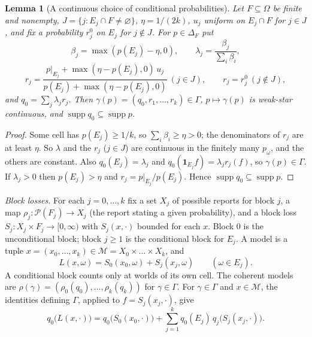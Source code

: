 \documentclass[11pt]{article}
\newtheorem{lemma}[theorem]{Lemma}
\theoremstyle{definition}
\theoremstyle{remark}
\newcommand{\M}{\mathcal M}
\newcommand{\PP}{\mathcal P}
\newcommand{\one}{\mathbf 1}
\newcommand{\supp}{\operatorname{supp}}
\begin{document}
\begin{lemma}[A continuous choice of conditional probabilities]\label{lem:section}
Let $F\subseteq\Omega$ be finite and nonempty, $J=\{j:E_j\cap F\ne\varnothing\}$, $\eta=1/(2k)$, $u_j$ uniform on $E_j\cap F$ for $j\in J$, and fix a probability $r_j^0$ on $E_j$ for $j\notin J$. For $p\in\Delta_F$ put
\[
\beta_j=\max(p(E_j)-\eta,0),\qquad \lambda_j=\frac{\beta_j}{\sum_i\beta_i},
\]
\[
r_j=\frac{p|_{E_j}+\max(\eta-p(E_j),0)\,u_j}{p(E_j)+\max(\eta-p(E_j),0)}\ (j\in J),\qquad r_j=r_j^0\ (j\notin J),
\]
and $q_0=\sum_j\lambda_jr_j$. Then $\gamma(p)=(q_0,r_1,\dots,r_k)\in\Gamma$, $p\mapsto\gamma(p)$ is weak-star continuous, and $\supp q_0\subseteq\supp p$.
\end{lemma}
\begin{proof}
Some cell has $p(E_j)\ge1/k$, so $\sum_i\beta_i\ge\eta>0$; the denominators of $r_j$ are at least $\eta$. So $\lambda$ and the $r_j$ ($j\in J$) are continuous in the finitely many $p_\omega$, and the others are constant. Also $q_0(E_j)=\lambda_j$ and $q_0(\one_{E_j}f)=\lambda_jr_j(f)$, so $\gamma(p)\in\Gamma$. If $\lambda_j>0$ then $p(E_j)>\eta$ and $r_j=p|_{E_j}/p(E_j)$. Hence $\supp q_0\subseteq\supp p$.
\end{proof}

\emph{Block losses.} For each $j=0,\dots,k$ fix a set $X_j$ of possible reports for block $j$, a map $\rho_j:\PP(F_j)\to X_j$ (the report stating a given probability), and a block loss $S_j:X_j\times F_j\to[0,\infty)$ with $S_j(x,\cdot)$ bounded for each $x$. Block $0$ is the unconditional block; block $j\ge1$ is the conditional block for $E_j$. A model is a tuple $x=(x_0,\dots,x_k)\in\M=X_0\times\dots\times X_k$, and
\[
 L(x,\omega)=S_0(x_0,\omega)+S_j(x_j,\omega)\qquad(\omega\in E_j).
\]
A conditional block counts only at worlds of its own cell. The coherent models are $\rho(\gamma)=(\rho_0(q_0),\dots,\rho_k(q_k))$ for $\gamma\in\Gamma$. For $\gamma\in\Gamma$ and $x\in\M$, the identities defining $\Gamma$, applied to $f=S_j(x_j,\cdot)$, give
\begin{equation}\label{eq:blocks}
 q_0\bigl(L(x,\cdot)\bigr)=q_0\bigl(S_0(x_0,\cdot)\bigr)+\sum_{j=1}^kq_0(E_j)\,q_j\bigl(S_j(x_j,\cdot)\bigr).
\end{equation}
\end{document}
